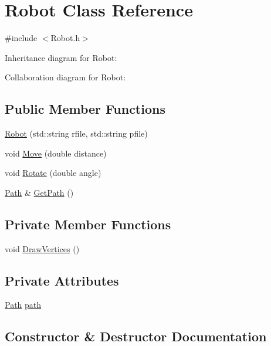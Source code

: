 \hypertarget{classRobot}{}\section{Robot Class Reference}
\label{classRobot}


{\ttfamily \#include $<$Robot.\+h$>$}



Inheritance diagram for Robot\+:


Collaboration diagram for Robot\+:
\subsection*{Public Member Functions}
\begin{DoxyCompactItemize}
\item 
\hyperlink{classRobot_ad228181e400915ecb155fbe904d828ab}{Robot} (std\+::string rfile, std\+::string pfile)
\item 
void \hyperlink{classRobot_ab259b89805dff8afe10bac7fb25da974}{Move} (double distance)
\item 
void \hyperlink{classRobot_a1cb405ec49d47c46f3aa87fde1415b59}{Rotate} (double angle)
\item 
\hyperlink{classPath}{Path} \& \hyperlink{classRobot_ac19ba71a9d911d584f110128316f3ec5}{Get\+Path} ()
\end{DoxyCompactItemize}
\subsection*{Private Member Functions}
\begin{DoxyCompactItemize}
\item 
void \hyperlink{classRobot_ac8cefdcbf2577ae0e44a65da59f4dcd5}{Draw\+Vertices} ()
\end{DoxyCompactItemize}
\subsection*{Private Attributes}
\begin{DoxyCompactItemize}
\item 
\hyperlink{classPath}{Path} \hyperlink{classRobot_a82c025500915b17b863d254c5dff42bd}{path}
\end{DoxyCompactItemize}


\subsection{Constructor \& Destructor Documentation}
\mbox{\label{classRobot_ad228181e400915ecb155fbe904d828ab}} 
